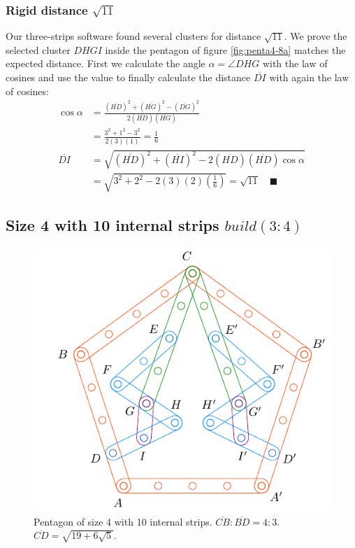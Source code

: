 \documentclass[11pt]{article}
\begin{document}
\subsubsection{Rigid distance $\sqrt{11}$}

Our three-strips software found several clusters for distance $\sqrt{11}$. We prove the selected cluster $DHGI$ inside the pentagon of figure \ref{fig:penta4-8a} matches the expected distance. First we calculate the angle $\alpha = \angle{DHG}$ with the law of cosines and use the value to finally calculate the distance $\overline{DI}$ with again the law of cosines:
\begin{align}
\cos\alpha &= \frac{(\overline{HD})^2 + (\overline{HG})^2 - (\overline{DG})^2}
 {2(\overline{HD})(\overline{HG})} \nonumber\\
 &= \frac{3^2 + 1^2 - 3^2}{2(3)(1)} = \frac{1}6 \\
\overline{DI} &= \sqrt{(\overline{HD})^2 + (\overline{HI})^2
 - 2(\overline{HD})(\overline{HD})\cos\alpha} \nonumber\\
 &= \sqrt{3^2 + 2^2 - 2(3)(2)\left(\frac{1}6\right)} = \sqrt{11} \quad\blacksquare
\end{align}

\subsection{Size 4 with 10 internal strips $build(3:4)$}

\begin{figure}[H]
\centering
\includegraphics[scale=1.1]{4/penta4-10a}
\caption{Pentagon of size 4 with 10 internal strips. $\overline{CB} : \overline{BD} = 4:3$. $\overline{CD} = \sqrt{19 + 6\sqrt5}$.}
\label{fig:penta4-10a}
\end{figure}
\end{document}
